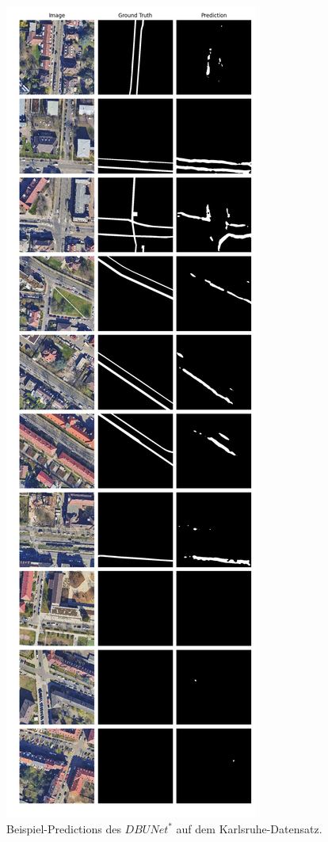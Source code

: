 \begin{figure}
	\centering
	\includegraphics[width=.41\textwidth]{Bilder/Samples-KA/dbunet-s.png} 
	\caption{Beispiel-Predictions des $DBUNet^*$ auf dem Karlsruhe-Datensatz.}
	\label{fig:ka-samples-dbunet-s}
\end{figure}

